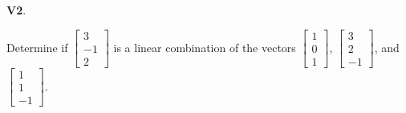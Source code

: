 \documentclass{article}
\newenvironment{problem}[1]
{
  \begin{flushleft}
  \textbf{#1}.
  \ignorespaces
}
{
  \end{flushleft}
}
\begin{document}
\begin{problem}{V2}
Determine if \(\begin{bmatrix} 3 \\ -1 \\ 2 \end{bmatrix} \) is a linear combination of the vectors
\(\begin{bmatrix} 1 \\ 0 \\ 1 \end{bmatrix} \),
\(\begin{bmatrix} 3 \\ 2 \\ -1 \end{bmatrix} \), and
\(\begin{bmatrix} 1 \\ 1 \\ -1 \end{bmatrix} \).
\end{problem}
\end{document}
